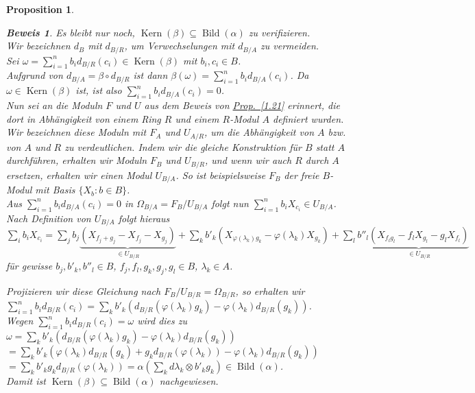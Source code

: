 \documentclass[a4paper,12pt]{scrbook}
\theoremstyle{break}
\newtheorem{Prop}[Def]{Proposition}
\theoremstyle{nonumberbreak}
\newtheorem{Bew}{Beweis}
\theoremstyle{nonumberplain}
\newcommand{\myref}[2]{%
\hyperref[#2]{#1~\ref*{#2}}%
}
\DeclareMathOperator{\Kern}{Kern}
\DeclareMathOperator{\Bild}{Bild}
\begin{document}
\begin{Prop}
\begin{enumerate}
\begin{Bew}
Es bleibt nur noch, $\Kern(\beta) \subseteq \Bild(\alpha)$ zu verifizieren.\\
Wir bezeichnen $d_B$ mit $d_{B/R}$, um Verwechselungen mit $d_{B/A}$ zu vermeiden.\\
Sei $\omega = \sum_{i=1}^n{b_i} d_{B/R}(c_i) \in \Kern(\beta)$ mit $b_i,c_i \in B$.\\
Aufgrund von $d_{B/A} = \beta \circ d_{B/R}$ ist dann $\beta(\omega) = \sum_{i=1}^n{b_i d_{B/A}}(c_i)$.
Da $\omega \in \Kern(\beta)$ ist, ist also $ \sum_{i=1}^n{b_i d_{B/A}}(c_i) = 0$.\\
Nun sei an die Moduln $F$ und $U$ aus dem Beweis von \myref{Prop.}{1.21} erinnert,
die dort in Abhängigkeit von einem Ring $R$ und einem $R$-Modul $A$ definiert wurden.
Wir bezeichnen diese Moduln mit $F_A$ und $U_{A/R}$, um die Abhängigkeit von $A$
bzw. von $A$ und $R$ zu verdeutlichen. Indem wir die gleiche Konstruktion für $B$ statt
$A$ durchführen, erhalten wir Moduln $F_B$ und $U_{B/R}$, und wenn wir auch $R$
durch $A$ ersetzen, erhalten wir einen Modul $U_{B/A}$. So ist beispielsweise $F_B$
der freie $B$-Modul mit Basis $\{ X_b : b \in B \}$. \\
Aus $ \sum_{i=1}^n{b_i d_{B/A}}(c_i) = 0$ in $\Omega_{B/A} = F_B / U_{B/A}$ folgt
nun $\sum_{i=1}^n{b_i X_{c_i}} \in U_{B/A}$. Nach Definition von $U_{B/A}$ folgt
hieraus
$\sum_i b_i X_{c_i} = \sum_j b_j \underbrace{(X_{f_j + g_j} - X_{f_j} - X_{g_j})}_{\in U_{B/R}} + \sum_k b'_k (X_{\varphi(\lambda_k) g_k} - \varphi(\lambda_k) X_{g_k}) + \sum_l b''_l \underbrace{(X_{f_l g_l} - f_l X_{g_l} - g_l X_{f_l})}_{\in U_{B/R}}$ für gewisse $b_j, b'_k, b''_l \in B$, $f_j,f_l,g_k,g_j,g_l \in B$, $\lambda_k \in A$.

Projizieren wir diese Gleichung nach $F_B / U_{B/R} = \Omega_{B/R}$, so erhalten wir \\
$\sum_{i=1}^n{b_i} d_{B/R}(c_i) = \sum_k b'_k (d_{B/R}(\varphi(\lambda_k) g_k) - \varphi(\lambda_k) d_{B/R}(g_k))$. \\
Wegen $\sum_{i=1}^n{b_i} d_{B/R}(c_i) = \omega$ wird dies zu \\
$\omega = \sum_k b'_k (d_{B/R}(\varphi(\lambda_k) g_k) - \varphi(\lambda_k) d_{B/R}(g_k))$\\
$= \sum_k b'_k (\varphi(\lambda_k) d_{B/R}(g_k) + g_k d_{B/R}(\varphi(\lambda_k)) - \varphi(\lambda_k) d_{B/R}(g_k))$\\
$= \sum_k b'_k g_k d_{B/R}(\varphi(\lambda_k))
 = \alpha(\sum_k d\lambda_k \otimes b'_k g_k) \in \Bild(\alpha)$. \\
Damit ist $\Kern(\beta) \subseteq \Bild(\alpha)$ nachgewiesen.
\end{Bew}
\end{enumerate}
\end{Prop}
\end{document}
